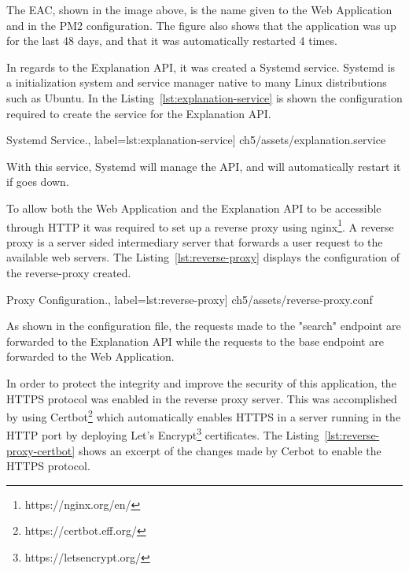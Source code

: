 The EAC, shown in the image above, is the name given to the Web Application and in the PM2 configuration.
The figure also shows that the application was up for the last 48 days, and that it was automatically restarted 4 times.

In regards to the Explanation API, it was created a Systemd service.
Systemd is a initialization system and service manager native to many Linux distributions such as Ubuntu.
In the Listing~\ref{lst:explanation-service} is shown the configuration required to create the service for the Explanation API.

\begin{center}
\begin{minipage}{0.95\linewidth}
 Systemd Service.,
label=lst:explanation-service]
{ch5/assets/explanation.service}
\end{minipage}
\end{center}

With this service, Systemd will manage the API, and will automatically restart it if goes down.

To allow both the Web Application and the Explanation API to be accessible through HTTP it was required to set up a reverse proxy using nginx\footnote{https://nginx.org/en/}.
A reverse proxy is a server sided intermediary server that forwards a user request to the available web servers.
The Listing~\ref{lst:reverse-proxy} displays the configuration of the reverse-proxy created.

\begin{center}
\begin{minipage}{0.95\linewidth}
 Proxy Configuration.,
label=lst:reverse-proxy]
{ch5/assets/reverse-proxy.conf}
\end{minipage}
\end{center}

As shown in the configuration file, the requests made to the "search" endpoint are forwarded to the Explanation API while the requests to the base endpoint are forwarded to the Web Application.

In order to protect the integrity and improve the security of this application, the HTTPS protocol was enabled in the reverse proxy server.
This was accomplished by using Certbot\footnote{https://certbot.eff.org/} which automatically enables HTTPS in a server running in the HTTP port by deploying Let's Encrypt\footnote{https://letsencrypt.org/} certificates.
The Listing~\ref{lst:reverse-proxy-certbot} shows an excerpt of the changes made by Cerbot to enable the HTTPS protocol.

